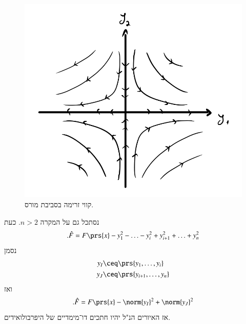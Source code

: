 \documentclass[a4paper,10pt,twoside,openany]{book}
\begin{document}
\begin{example}
\begin{figure}
\centering
\includegraphics[scale=0.5]{sources/2.2}
\caption{קווי זרימה בסביבת מורס.}
\label{2.2}
\end{figure}

נסתכל גם על המקרה
$n > 2$.
כעת
\[\text{.} \hat{F} = F\prs{x} - y_1^2 - \ldots - y_i^2 + y_{i+1}^2 + \ldots + y_n^2\]
נסמן
\begin{align*}
y_I &\ceq \prs{y_1, \ldots, y_i} \\
y_J &\ceq \prs{y_{i+1}, \ldots, y_n}
\end{align*}
ואז
\[\text{.} \hat{F} = F\prs{x} - \norm{y_I}^2 + \norm{y_J}^2\]
אז האיורים הנ"ל יהיו חתכים דו־מימדיים של היפרבולואידים.
\end{example}
\end{document}
